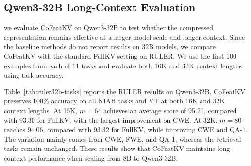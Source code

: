 \documentclass{article} %
\begin{document}
\subsection{Qwen3-32B Long-Context Evaluation}

we evaluate CoFeatKV on Qwen3-32B to test whether the compressed
representation remains effective at a larger model scale and longer context.
Since the baseline methods do not report results on 32B models, we compare
CoFeatKV with the standard FullKV setting on RULER. We use the first 100
examples from each of 11 tasks and evaluate both 16K and 32K context lengths
using task accuracy.

\begin{table}[H]
\centering
\caption{Per-task Qwen3-32B RULER accuracy. S1--S3 achieve 100.0 in all settings and are included in the average.}
\label{tab:ruler32b-tasks}
\scriptsize
\setlength{\tabcolsep}{3.2pt}


\end{table}

Table~\ref{tab:ruler32b-tasks} reports the RULER results on Qwen3-32B.
CoFeatKV preserves 100\% accuracy on all NIAH tasks and VT at both 16K and
32K context lengths. At 16K, $m=64$ achieves an average score of 95.21,
compared with 93.30 for FullKV, with the largest improvement on CWE. At 32K,
$m=80$ reaches 94.06, compared with 93.32 for FullKV, while improving CWE and
QA-1. The variation mainly comes from CWE, FWE, and QA-1, whereas the retrieval
tasks remain unchanged. These results show that CoFeatKV maintains
long-context performance when scaling from 8B to Qwen3-32B.
\end{document}
